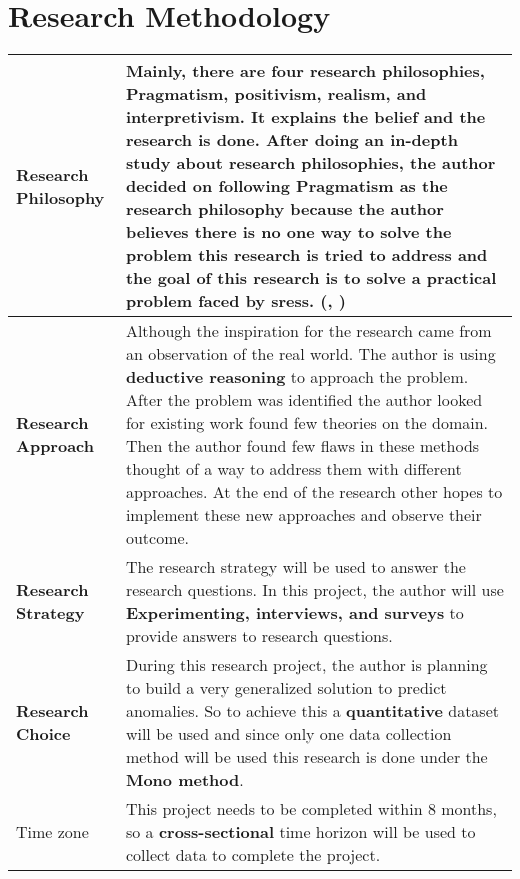\newpage
{\let\clearpage\relax \chapter{Research Methodology}}

\begin{longtable}{|p{4cm}|p{10cm}|}
\hline
  \textbf{Research Philosophy} & 
  Mainly, there are four research philosophies, Pragmatism, positivism, realism, and interpretivism. It explains the belief and the research is done. After doing an in-depth study about research philosophies, the author decided on following \textbf{Pragmatism} as the research philosophy because the author believes there is no one way to solve the problem this research is tried to address and the goal of this research is to solve a practical problem faced by \acp{sres}. (\cite{1Philoso75:online}, \cite{Pragmati87:online})
  \\ \hline
  
  \textbf{Research Approach} & 
  Although the inspiration for the research came from an observation of the real world. The author is using \textbf{deductive reasoning} to approach the problem. After the problem was identified the author looked for existing work found few theories on the domain. Then the author found few flaws in these methods thought of a way to address them with different approaches. At the end of the research other hopes to implement these new approaches and observe their outcome.
  \\ \hline
  
  \textbf{Research Strategy} & 
  The research strategy will be used to answer the research questions. In this project, the author will use \textbf{Experimenting, interviews, and surveys} to provide answers to research questions.
  \\ \hline
  
  \textbf{Research Choice} & 
  During this research project, the author is planning to build a very generalized solution to predict anomalies.  So to achieve this a \textbf{quantitative} dataset will be used and since only one data collection method will be used this research is done under the\textbf{ Mono method}.
  \\ \hline
  
  Time zone & 
  This project needs to be completed within 8 months, so a \textbf{cross-sectional} time horizon will be used to collect data to complete the project.
  \\ \hline
\end{longtable}
